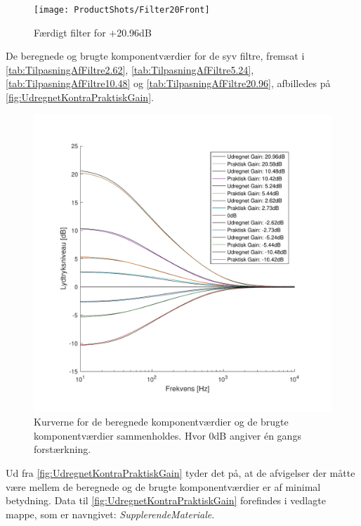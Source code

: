 %
\begin{figure}[H]
	\centering
	\texttt{[image: ProductShots/Filter20Front]}
	\caption{Færdigt filter for $+$20.96dB}
	\label{fig:Filter20Front}
\end{figure}
%
\newpage
\noindent
%
De beregnede og brugte komponentværdier for de syv filtre, fremsat i \autoref{tab:TilpasningAfFiltre2.62}, \autoref{tab:TilpasningAfFiltre5.24}, \autoref{tab:TilpasningAfFiltre10.48} og \autoref{tab:TilpasningAfFiltre20.96}, afbilledes på \autoref{fig:UdregnetKontraPraktiskGain}.
%
\begin{figure}[H]
	\centering
	\includegraphics[resolution=300,width=\textwidth]{Figure/DesignAfFilter/UdregnetKontraPraktiskGain.pdf}
	\caption{Kurverne for de beregnede komponentværdier og de brugte komponentværdier sammenholdes. Hvor 0dB angiver én gangs forstærkning.}
	\label{fig:UdregnetKontraPraktiskGain}
\end{figure}
\noindent
%
Ud fra \autoref{fig:UdregnetKontraPraktiskGain} tyder det på, at de afvigelser der måtte være mellem de beregnede og de brugte komponentværdier er af minimal betydning. Data til \autoref{fig:UdregnetKontraPraktiskGain} forefindes i vedlagte mappe, som er navngivet: \textit{SupplerendeMateriale}. 

 
